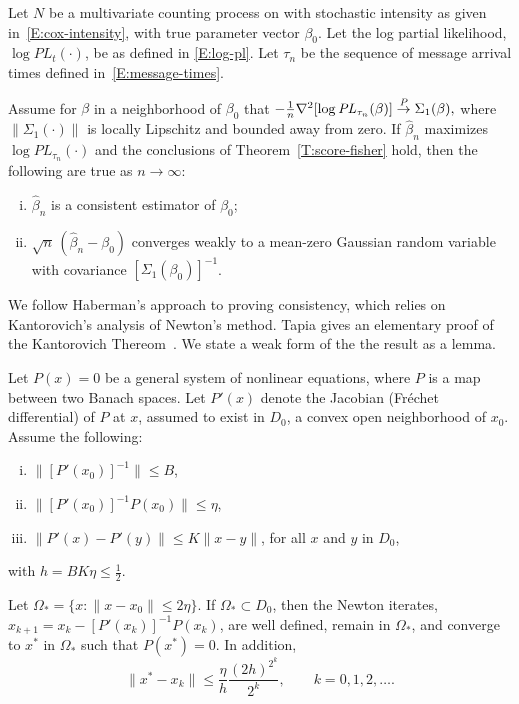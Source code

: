 \documentclass[aoas,preprint]{imsart}
\begin{document}
\begin{theorem}\label{T:consistency}
    Let $N$ be a multivariate counting process on with stochastic
    intensity as given in~\eqref{E:cox-intensity}, with true parameter
    vector $\beta_0$.  Let the log partial likelihood,
    $\log \mathit{PL}_t(\cdot)$, be as defined in \eqref{E:log-pl}.
    Let $\tau_n$ be the sequence of message arrival times defined
    in~\eqref{E:message-times}.
    
    Assume for $\beta$ in a
    neighborhood of $\beta_0$ that
    \(
        -\tfrac{1}{n} \nabla^2 [ \log \mathit{PL}_{\tau_n}(\beta)]
            \overset{\mathit{P}}{\to} \Sigma_1(\beta),
    \)
    where $\| \Sigma_1(\cdot) \|$ is locally Lipschitz and bounded
    away from zero.
    If $\hat \beta_n$ maximizes $\log \mathit{PL}_{\tau_n}(\cdot)$
    and the conclusions of Theorem~\ref{T:score-fisher} hold, then
    the following are true as $n\to\infty$:
    \begin{enumerate}[(i)]
        \item $\hat \beta_n$ is a consistent estimator of $\beta_0$;
        \item $\sqrt{n} \, (\hat \beta_n - \beta_0)$ converges weakly
            to a mean-zero Gaussian random variable with covariance
            $[\Sigma_1(\beta_0)]^{-1}$.
    \end{enumerate}
\end{theorem}

We follow Haberman's approach to proving
consistency, which relies on Kantorovich's analysis
of Newton's method.  Tapia gives an elementary proof of the Kantorovich
Thereom~\cite{haberman1977maximum,kantorovich1952functional,tapia1971kantorovich}.
We state a weak form of the the result as a lemma.

\begin{lemma}
    Let $P(x) = 0$ be a general system of nonlinear equations, where $P$ is
    a map between two Banach spaces.  Let $P'(x)$ denote the Jacobian
    (Fr\'echet differential) of $P$ at $x$, assumed to exist in $D_0$,
    a convex open neighborhood of $x_0$.  Assume the following:
    \begin{enumerate}[(i)]
        \item $\| [P'(x_0)]^{-1} \| \leq B$,
        \item $\| [P'(x_0)]^{-1} P(x_0) \| \leq \eta$,
        \item $\| P'(x) - P'(y) \| \leq K \| x - y \|$,\quad
            for all $x$ and $y$ in $D_0$,
    \end{enumerate}
    with $h = B K \eta \leq \tfrac{1}{2}$.
    
    Let $\Omega_\ast = \{ x : \| x - x_0 \| \leq 2 \eta \}$.
    If $\Omega_\ast \subset D_0$, then the Newton iterates,
    $x_{k+1} = x_k - [P'(x_k)]^{-1} P(x_k)$, are well defined, remain
    in $\Omega_\ast$, and converge to $x^\ast$ in $\Omega_\ast$ such
    that $P(x^\ast) = 0$.  In addition,
    \[
        \| x^\ast - x_k \|
            \leq
                \frac{\eta}{h}
                \frac{(2h)^{2^k}}{2^k},
        \qquad
        k = 0, 1, 2, \ldots.
    \]
\end{lemma}
\end{document}
